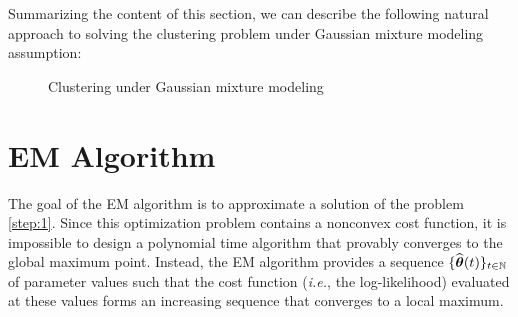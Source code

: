 Summarizing the content of this section, we can describe the following  natural approach to solving the clustering problem under Gaussian
mixture modeling assumption:
\begin{figure}[h]
\begin{center}
   \caption{Clustering under Gaussian mixture modeling}
   \label{algo:general}
\end{center}
\vspace{-15pt}
\end{figure}


\section{EM Algorithm}

The goal of the EM algorithm is to approximate a solution of the problem \eqref{step:1}.
Since this optimization problem contains a nonconvex cost function, it is impossible to
design a polynomial time algorithm that provably converges to the global maximum point. Instead,
the EM algorithm provides a sequence $\{\widehat{{\boldsymbol\theta}}(t)\}_{t\in{\mathbb N}}$ of parameter values such that
the cost function (\textit{i.e.}, the log-likelihood) evaluated at these values forms an
increasing sequence that converges to a local maximum.

